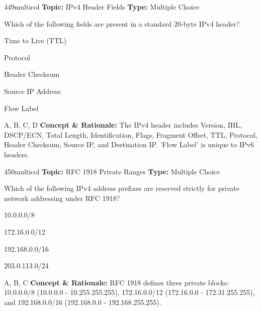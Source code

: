 \begin{qcard}{449}{multicol}
\textcolor{darkslate!75}{\small\textbf{Topic:} IPv4 Header Fields \hfill \textbf{Type:} Multiple Choice}\vspace{0.4em}\par
Which of the following fields are present in a standard 20-byte IPv4 header?
\begin{qoptions}
\item Time to Live (TTL)
\item Protocol
\item Header Checksum
\item Source IP Address
\item Flow Label
\end{qoptions}
\end{qcard}
\nopagebreak
\begin{explainbox}{A, B, C, D}
\textbf{Concept \& Rationale:} The IPv4 header includes Version, IHL, DSCP/ECN, Total Length, Identification, Flags, Fragment Offset, TTL, Protocol, Header Checksum, Source IP, and Destination IP. 'Flow Label' is unique to IPv6 headers.
\end{explainbox}

\begin{qcard}{450}{multicol}
\textcolor{darkslate!75}{\small\textbf{Topic:} RFC 1918 Private Ranges \hfill \textbf{Type:} Multiple Choice}\vspace{0.4em}\par
Which of the following IPv4 address prefixes are reserved strictly for private network addressing under RFC 1918?
\begin{qoptions}
\item 10.0.0.0/8
\item 172.16.0.0/12
\item 192.168.0.0/16
\item 203.0.113.0/24
\end{qoptions}
\end{qcard}
\nopagebreak
\begin{explainbox}{A, B, C}
\textbf{Concept \& Rationale:} RFC 1918 defines three private blocks: 10.0.0.0/8 (10.0.0.0 - 10.255.255.255), 172.16.0.0/12 (172.16.0.0 - 172.31.255.255), and 192.168.0.0/16 (192.168.0.0 - 192.168.255.255).
\end{explainbox}

